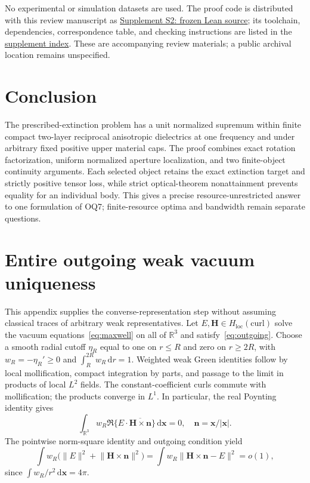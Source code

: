\documentclass[11pt]{article}
\newcommand{\dd}{\,\mathrm{d}}
\newcommand{\norm}[1]{\lVert #1\rVert}
\newcommand{\abs}[1]{\lvert #1\rvert}
\begin{document}
No experimental or simulation datasets are used. The proof code is distributed with this review manuscript as \href{reproducibility/OQ7-complete-physical-theorem11-source.zip}{Supplement S2: frozen Lean source}; its toolchain, dependencies, correspondence table, and checking instructions are listed in the \href{reproducibility/SUPPLEMENT_INDEX.html}{supplement index}. These are accompanying review materials; a public archival location remains unspecified.

\section{Conclusion}\label{sec:conclusion}
The prescribed-extinction problem has a unit normalized supremum within finite compact two-layer reciprocal anisotropic dielectrics at one frequency and under arbitrary fixed positive upper material caps. The proof combines exact rotation factorization, uniform normalized aperture localization, and two finite-object continuity arguments. Each selected object retains the exact extinction target and strictly positive tensor loss, while strict optical-theorem nonattainment prevents equality for an individual body. This gives a precise resource-unrestricted answer to one formulation of OQ7; finite-resource optima and bandwidth remain separate questions.

\appendix
\section{Entire outgoing weak vacuum uniqueness}\label{app:weak}
This appendix supplies the converse-representation step without assuming classical traces of arbitrary weak representatives. Let $E,\mathbf H\in H_{\mathrm{loc}}(\mathrm{curl})$ solve the vacuum equations~\eqref{eq:maxwell} on all of $\mathbb R^3$ and satisfy~\eqref{eq:outgoing}. Choose a smooth radial cutoff $\eta_R$ equal to one on $r\leq R$ and zero on $r\geq2R$, with $w_R=-\eta_R'\geq0$ and $\int_R^{2R}w_R\dd r=1$. Weighted weak Green identities follow by local mollification, compact integration by parts, and passage to the limit in products of local $L^2$ fields. The constant-coefficient curls commute with mollification; the products converge in $L^1$. In particular, the real Poynting identity gives
\begin{equation}\label{eq:weak-energy}
 \int_{\mathbb R^3}w_R\Re\{E\cdot\overline{\mathbf H\times\mathbf n}\}\dd\mathbf x=0,
 \quad\mathbf n=\mathbf x/\abs{\mathbf x}.
\end{equation}
The pointwise norm-square identity and outgoing condition yield
\begin{equation}\label{eq:weak-shell}
 \int w_R\bigl(\norm E^2+\norm{\mathbf H\times\mathbf n}^2\bigr)
 =\int w_R\norm{\mathbf H\times\mathbf n-E}^2=o(1),
\end{equation}
since $\int w_R/r^2\dd\mathbf x=4\pi$.
\end{document}
